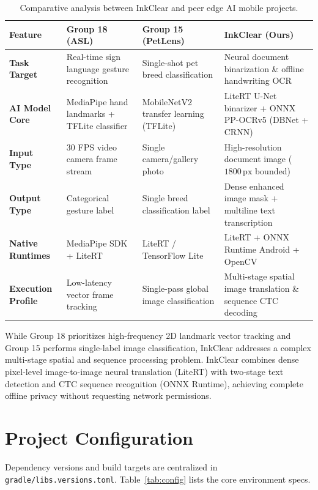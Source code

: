 \documentclass[11pt,a4paper]{article}
\begin{document}
\begin{table}[h]
\centering
\small
\begin{tabular}{lp{3.5cm}p{3.5cm}p{4.2cm}}
\toprule
\textbf{Feature} & \textbf{Group 18 (ASL)} & \textbf{Group 15 (PetLens)} & \textbf{InkClear (Ours)} \\
\midrule
\textbf{Task Target} & Real-time sign language gesture recognition & Single-shot pet breed classification & Neural document binarization \& offline handwriting OCR \\
\textbf{AI Model Core} & MediaPipe hand landmarks + TFLite classifier & MobileNetV2 transfer learning (TFLite) & LiteRT U-Net binarizer + ONNX PP-OCRv5 (DBNet + CRNN) \\
\textbf{Input Type} & 30 FPS video camera frame stream & Single camera/gallery photo & High-resolution document image ($1800\,\text{px}$ bounded) \\
\textbf{Output Type} & Categorical gesture label & Single breed classification label & Dense enhanced image mask + multiline text transcription \\
\textbf{Native Runtimes} & MediaPipe SDK + LiteRT & LiteRT / TensorFlow Lite & LiteRT + ONNX Runtime Android + OpenCV \\
\textbf{Execution Profile} & Low-latency vector frame tracking & Single-pass global image classification & Multi-stage spatial image translation \& sequence CTC decoding \\
\bottomrule
\end{tabular}
\caption{Comparative analysis between InkClear and peer edge AI mobile projects.}
\label{tab:comparison}
\end{table}

While Group 18 prioritizes high-frequency 2D landmark vector tracking and Group 15 performs single-label image classification, InkClear addresses a complex multi-stage spatial and sequence processing problem. InkClear combines dense pixel-level image-to-image neural translation (LiteRT) with two-stage text detection and CTC sequence recognition (ONNX Runtime), achieving complete offline privacy without requesting network permissions.

\section{Project Configuration}

Dependency versions and build targets are centralized in \texttt{gradle/libs.versions.toml}. Table~\ref{tab:config} lists the core environment specs.
\end{document}
